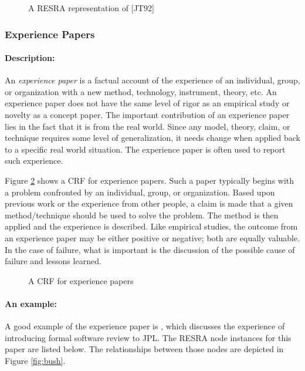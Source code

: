 \begin{figure}[htb]
  \caption{A RESRA representation of [JT92]} 
  \label{fig:johnson}
\end{figure}


\subsubsection{Experience Papers}

\paragraph{Description:}

An {\it experience paper\/} is a factual account of the experience of an
individual, group, or organization with a new method, technology,
instrument, theory, etc. An experience paper does not have the same level
of rigor as an empirical study or novelty as a concept paper. The important
contribution of an experience paper lies in the fact that it is from the
real world. Since any model, theory, claim, or technique requires some
level of generalization, it needs change when applied back to a specific
real world situation. The experience paper is often used to report such
experience.

Figure \ref{fig:experience-crf} shows a CRF for experience papers. Such a
paper typically begins with a problem confronted by an individual, group,
or organization. Based upon previous work or the experience from other
people, a claim is made that a given method/technique should be used to
solve the problem. The method is then applied and the experience is
described. Like empirical studies, the outcome from an experience paper may
be either positive or negative; both are equally valuable. In the case of
failure, what is important is the discussion of the possible cause of
failure and lessons learned.

\begin{figure}[htb]
  \caption{A CRF for experience papers} 
  \label{fig:experience-crf}
\end{figure}


\paragraph{An example:}

A good example of the experience paper is \cite{Bush90}, which discusses
the experience of introducing formal software review to JPL. The RESRA node
instances for this paper are listed below. The relationships between those
nodes are depicted in Figure \ref{fig:bush}.

